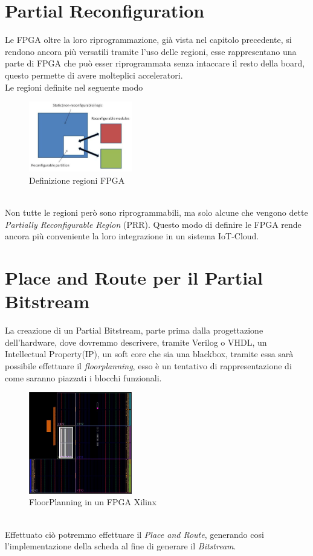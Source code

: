 \section{Partial Reconfiguration}
Le FPGA oltre la loro riprogrammazione, già vista nel capitolo precedente, si rendono ancora più versatili tramite l'uso delle regioni, esse rappresentano una parte di FPGA che può esser riprogrammata senza intaccare il resto della board, questo permette di avere molteplici acceleratori.\\
Le regioni definite nel seguente modo
\begin{figure}
    \centering
    \includegraphics[width=0.4\textwidth]{images/PR1.png}
    \caption{Definizione regioni FPGA}
    \label{fig:my_label}
\end{figure}\\
Non tutte le regioni però sono riprogrammabili, ma solo alcune che vengono dette \textit{Partially Reconfigurable Region} (PRR). Questo modo di definire le FPGA rende ancora più conveniente la loro integrazione in un sistema IoT-Cloud.
\section{Place and Route per il Partial Bitstream}
La creazione di un Partial Bitstream, parte prima dalla progettazione dell'hardware, dove dovremmo descrivere, tramite Verilog o VHDL, un Intellectual Property(IP)\cite{PRRGIT}, un soft core che sia una blackbox, tramite essa sarà possibile effettuare il \textit{floorplanning}, esso è un tentativo di rappresentazione di come saranno piazzati i blocchi funzionali.
\begin{figure}
    \centering
    \includegraphics[width=0.4\textwidth]{images/Floor1.jpg}
    \caption{FloorPlanning in un FPGA Xilinx}
    \label{fig:my_label}
\end{figure}\\
Effettuato ciò potremmo effettuare il \textit{Place and Route}, generando cosi l'implementazione della scheda al fine di generare il \textit{Bitstream}\cite{PRR}. 
